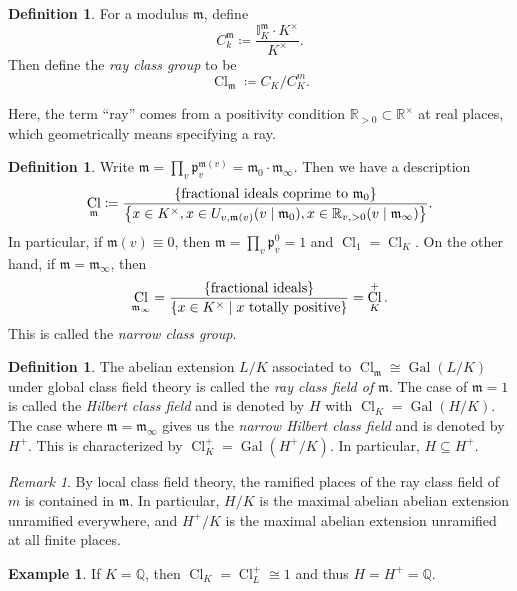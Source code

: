 \documentclass[leqno, openany]{memoir}
\theoremstyle{definition}
\newtheorem{defn}[thm]{Definition}
\newtheorem{exm}[thm]{Example}
\theoremstyle{remark}
\newtheorem{rmk}[thm]{Remark}
\theoremstyle{plain}
\theoremstyle{definition}
\theoremstyle{remark}
\newcommand{\R}{\mathbb{R}}
\newcommand{\Q}{\mathbb{Q}}
\newcommand{\I}{\mathbb{I}}
\newcommand{\mf}[1]{\mathfrak{#1}}
\DeclareMathOperator{\Gal}{Gal}
\DeclareMathOperator{\Cl}{Cl}
\begin{document}
\begin{defn}
    For a modulus $\mf{m}$, define
    \[ C_k^{ \mf{m} } \coloneqq \frac{\I_K^{ \mf{m} } \cdot K^{\times}}{K^{\times}}. \]
    Then define the \textit{ray class group} to be
    \[ \Cl_{\mf{m}} \coloneqq C_K / C_K^m. \]
\end{defn}

Here, the term ``ray'' comes from a positivity condition $\R_{>0} \subset \R^{\times}$ at real places, which geometrically means specifying a ray.

\begin{defn}
    Write $\mf{m} = \prod_v \mf{p}_v^{\mf{m}(v)} = \mf{m}_0 \cdot \mf{m}_{\infty}$. Then we have a description
    \[ \Cl_{\mf{m}} \coloneqq \frac{ \qty{\text{fractional ideals coprime to $\mf{m}_0$}} }{\qty{x \in K^{\times}, x \in U_{v, \mf{m}(v)} (v \mid \mf{m}_0), x \in \R_{v,>0} (v \mid \mf{m}_{\infty})}}. \]
    In particular, if $\mf{m}(v) \equiv 0$, then $\mf{m} = \prod_v \mf{p}_v^0 = 1$ and $\Cl_1 = \Cl_K$. On the other hand, if $\mf{m} = \mf{m}_{\infty}$, then
    \[ \Cl_{\mf{m}_{\infty}} = \frac{\qty{\text{fractional ideals}}}{\qty{x \in K^{\times} \mid x\ \text{totally positive}}} = \Cl_K^+. \]
    This is called the \textit{narrow class group}. 
\end{defn}

\begin{defn}
    The abelian extension $L/K$ associated to $\Cl_{ \mf{m} } \cong \Gal(L/K)$ under global class field theory is called the \textit{ray class field of $\mf{m}$}. The case of $\mf{m}=1$ is called the \textit{Hilbert class field} and is denoted by $H$ with $\Cl_K = \Gal(H/K)$. The case where $\mf{m} = \mf{m}_{\infty}$ gives us the \textit{narrow Hilbert class field} and is denoted by $H^+$. This is characterized by $\Cl_K^+ = \Gal(H^+/K)$. In particular, $H \subseteq H^+$.  
\end{defn}

\begin{rmk}
    By local class field theory, the ramified places of the ray class field of $m$ is contained in $\mf{m}$. In particular, $H/K$ is the maximal abelian abelian extension unramified everywhere, and $H^+/K$ is the maximal abelian extension unramified at all finite places.
\end{rmk}

\begin{exm}
    If $K = \Q$, then $\Cl_K = \Cl_L^+ \cong \qty{1}$ and thus $H = H^+ = \Q$.
\end{exm}
\end{document}
